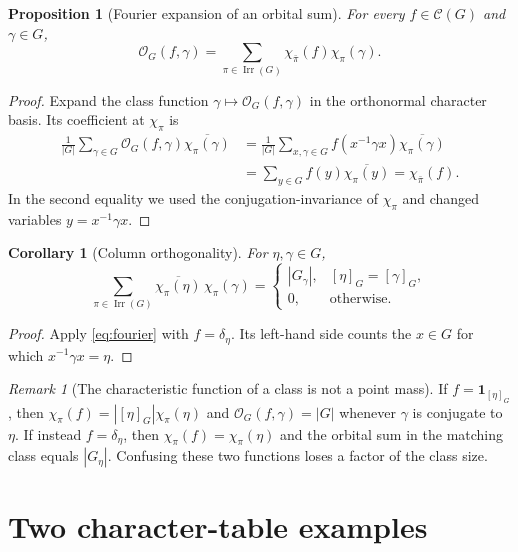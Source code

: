 \documentclass[12pt]{article}
\newtheorem{proposition}[theorem]{Proposition}
\newtheorem{corollary}[theorem]{Corollary}
\theoremstyle{remark}
\newtheorem{remark}[theorem]{Remark}
\newcommand{\Irr}{\operatorname{Irr}}
\newcommand{\cG}{\mathcal C(G)}
\newcommand{\Orb}{\mathcal O}
\begin{document}
\begin{proposition}[Fourier expansion of an orbital sum]\label{prop:fourier}
For every $f\in\cG$ and $\gamma\in G$,
\begin{equation}\label{eq:fourier}
 \boxed{\displaystyle
 \Orb_G(f,\gamma)=
 \sum_{\pi\in\Irr(G)}\chi_{\bar\pi}(f)\chi_\pi(\gamma).}
\end{equation}
\end{proposition}
\begin{proof}
Expand the class function $\gamma\mapsto\Orb_G(f,\gamma)$
in the orthonormal character basis. Its coefficient at $\chi_\pi$ is
\begin{align*}
 \frac1{|G|}\sum_{\gamma\in G}
       \Orb_G(f,\gamma)\overline{\chi_\pi(\gamma)}
 &=\frac1{|G|}\sum_{x,\gamma\in G}
       f(x^{-1}\gamma x)\overline{\chi_\pi(\gamma)}\\
 &=\sum_{y\in G}f(y)\overline{\chi_\pi(y)}
 =\chi_{\bar\pi}(f).
\end{align*}
In the second equality we used the conjugation-invariance of
$\chi_\pi$ and changed variables $y=x^{-1}\gamma x$.
\end{proof}
\begin{corollary}[Column orthogonality]\label{cor:column}
For $\eta,\gamma\in G$,
\begin{equation}\label{eq:columnorth}
 \sum_{\pi\in\Irr(G)}
   \overline{\chi_\pi(\eta)}\,\chi_\pi(\gamma)
 =\begin{cases}
    |G_\gamma|,&[\eta]_G=[\gamma]_G,\\
    0,&\text{otherwise}.
   \end{cases}
\end{equation}
\end{corollary}
\begin{proof}
Apply \eqref{eq:fourier} with $f=\delta_\eta$. Its left-hand side
counts the $x\in G$ for which $x^{-1}\gamma x=\eta$.
\end{proof}
\begin{remark}[The characteristic function of a class is not a point mass]
If $f=\mathbf1_{[\eta]_G}$, then
$\chi_\pi(f)=|[\eta]_G|\chi_\pi(\eta)$ and
$\Orb_G(f,\gamma)=|G|$ whenever $\gamma$ is conjugate to $\eta$.
If instead $f=\delta_\eta$, then $\chi_\pi(f)=\chi_\pi(\eta)$ and
the orbital sum in the matching class equals $|G_\eta|$.
Confusing these two functions loses a factor of the class size.
\end{remark}

\section{Two character-table examples}
\end{document}
